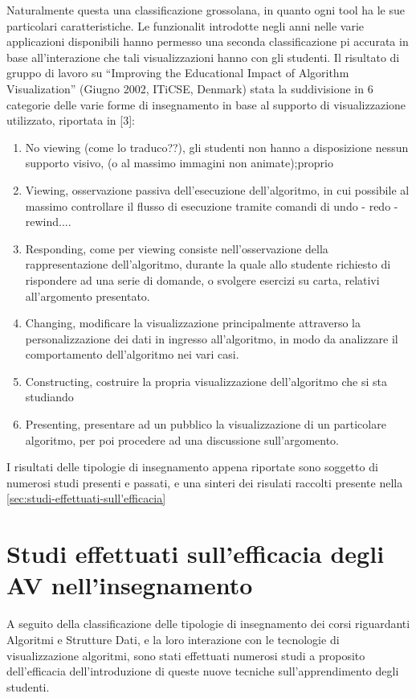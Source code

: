 Naturalmente questa  una classificazione grossolana, in quanto ogni
tool ha le sue particolari caratteristiche. Le funzionalit introdotte
negli anni nelle varie applicazioni disponibili hanno permesso una
seconda classificazione pi accurata in base all'interazione che tali
visualizzazioni hanno con gli studenti. Il risultato di gruppo di
lavoro su {}``Improving the Educational Impact of Algorithm Visualization''
(Giugno 2002, ITiCSE, Denmark)  stata la suddivisione in 6 categorie
delle varie forme di insegnamento in base al supporto di visualizzazione
utilizzato, riportata in {[}3{]}:
\begin{enumerate}
\item No viewing (come lo traduco??), gli studenti non hanno a disposizione
nessun supporto visivo, (o al massimo immagini non animate);proprio 
\item Viewing, osservazione passiva dell'esecuzione dell'algoritmo, in cui
 possibile al massimo controllare il flusso di esecuzione tramite
comandi di undo - redo - rewind....
\item Responding, come per viewing consiste nell'osservazione della rappresentazione
dell'algoritmo, durante la quale allo studente  richiesto di rispondere
ad una serie di domande, o svolgere esercizi su carta, relativi all'argomento
presentato.
\item Changing, modificare la visualizzazione principalmente attraverso
la personalizzazione dei dati in ingresso all'algoritmo, in modo da
analizzare il comportamento dell'algoritmo nei vari casi.
\item Constructing, costruire la propria visualizzazione dell'algoritmo
che si sta studiando
\item Presenting, presentare ad un pubblico la visualizzazione di un particolare
algoritmo, per poi procedere ad una discussione sull'argomento.
\end{enumerate}
I risultati delle tipologie di insegnamento appena riportate sono
soggetto di numerosi studi presenti e passati, e una sinteri dei risulati
raccolti  presente nella \ref{sec:studi-effettuati-sull'efficacia}


\section{\label{sec:studi-effettuati-sull'efficacia}Studi effettuati sull'efficacia
degli AV nell'insegnamento}

A seguito della classificazione delle tipologie di insegnamento dei
corsi riguardanti Algoritmi e Strutture Dati, e la loro interazione
con le tecnologie di visualizzazione algoritmi, sono stati effettuati
numerosi studi a proposito dell'efficacia dell'introduzione di queste
nuove tecniche sull'apprendimento degli studenti.

